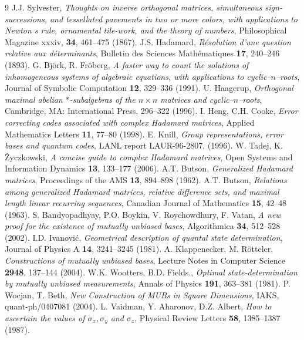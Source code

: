 \documentclass[a4paper,12pt,twoside]{article}
\begin{document}
\begin{thebibliography}{9}
 J.J. Sylvester, \emph{Thoughts on inverse orthogonal matrices, simultaneous sign-successions, and tessellated pavements in two or more colors, with applications to Newton s rule, ornamental tile-work, and the theory of numbers}, Philosophical Magazine xxxiv, {\bf 34}, 461--475 (1867).
 J.S. Hadamard, \emph{R\'{e}solution d'une question relative aux d\'{e}terminants}, Bulletin des Sciences Math\'{e}matiques {\bf 17}, 240--246 (1893).
 G. Bj{\"o}rk, R. Fr{\"o}berg, \emph{A faster way to count the solutions of inhomogeneous systems of algebraic equations, with applications to cyclic--$n$--roots}, Journal of Symbolic Computation {\bf 12}, 329--336 (1991).
 U. Haagerup, \emph{Orthogonal maximal abelian $*$-subalgebras of the $n \times n$ matrices and cyclic--$n$--roots}, Cambridge, MA: International Press, 296--322 (1996).
 I. Heng, C.H. Cooke, \emph{Error correcting codes associated with complex Hadamard matrices}, Applied Mathematics Letters {\bf 11}, 77--80 (1998).
 E. Knill, \emph{Group representations, error bases and quantum codes}, LANL report LAUR-96-2807, (1996).
 W. Tadej, K. \.{Z}yczkowski, \emph{A concise guide to complex Hadamard matrices}, Open Systems and Information Dynamics {\bf 13}, 133--177 (2006).
 A.T. Butson, \emph{Generalized Hadamard matrices}, Proceedings of the AMS {\bf 13}, 894--898 (1962).
 A.T. Butson, \emph{Relations among generalized Hadamard matrices, relative difference sets, and maximal length linear recurring sequences}, Canadian Journal of Mathematics {\bf 15}, 42--48 (1963).
 S. Bandyopadhyay, P.O. Boykin, V. Roychowdhury, F. Vatan, \emph{A new proof for the existence of mutually unbiased bases}, Algorithmica {\bf 34}, 512--528 (2002).
 I.D. Ivanovi\'{c}, \emph{Geometrical description of quantal state determination}, Journal of Physics A {\bf 14}, 3241--3245 (1981).
 A. Klappenecker, M. R\"{o}tteler, \emph{Constructions of mutually unbiased bases}, Lecture Notes in Computer Science {\bf 2948}, 137--144 (2004).
 W.K. Wootters, B.D. Fields., \emph{Optimal state-determination by mutually unbiased measurements}, Annals of Physics {\bf 191}, 363--381 (1981).
 P. Wocjan, T. Beth, \emph{New Construction of MUBs in Square Dimensions}, IAKS, quant-ph/0407081 (2004).
 L. Vaidman, Y. Aharonov, D.Z. Albert, \emph{How to ascertain the values of $\sigma_x, \sigma_y$ and $ \sigma_z$}, Physical Review Letters {\bf 58}, 1385--1387 (1987).

\end{thebibliography}
\end{document}
